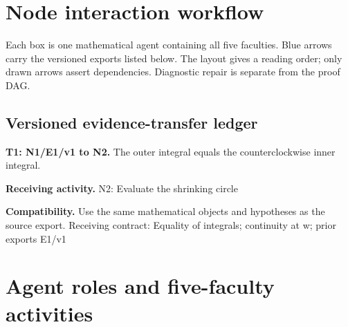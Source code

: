 \documentclass[preprint,12pt,aps,pra,showkeys,amsmath,amssymb,superscriptaddress,floatfix]{revtex4-2}
\theoremstyle{definition}
\theoremstyle{remark}
\newcommand{\field}[2]{\par\smallskip\noindent\textbf{#1.} #2\par}
\begin{document}
\clearpage\section{Node interaction workflow}

\begin{center}\end{center}

Each box is one mathematical agent containing all five faculties. Blue
arrows carry the versioned exports listed below. The layout gives a
reading order; only drawn arrows assert dependencies. Diagnostic repair
is separate from the proof DAG.

\subsection{Versioned evidence-transfer ledger}

\begingroup\small\linespread{1.05}\selectfont

\field{T1: N1/E1/v1 to N2}{The outer integral equals the counterclockwise inner integral.}

\field{Receiving activity}{N2: Evaluate the shrinking circle}

\field{Compatibility}{Use the same mathematical objects and hypotheses as the source export.
Receiving contract: Equality of integrals; continuity at w; prior
exports E1/v1}

\endgroup

\clearpage\section{Agent roles and five-faculty activities}\begingroup\small\linespread{1.05}\selectfont{}
\end{document}
